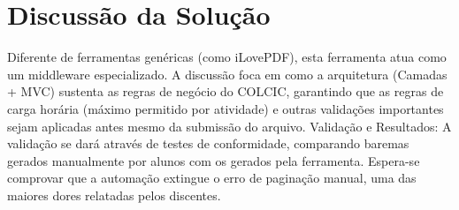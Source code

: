 \chapter{Discussão da Solução}

Diferente de ferramentas genéricas (como iLovePDF), esta ferramenta atua como um middleware especializado. A discussão foca em como a arquitetura (Camadas + MVC) sustenta as regras de negócio do COLCIC, garantindo que as regras de carga horária (máximo permitido por atividade) e outras validações importantes sejam aplicadas antes mesmo da submissão do arquivo.
Validação e Resultados: A validação se dará através de testes de conformidade, comparando baremas gerados manualmente por alunos com os gerados pela ferramenta. Espera-se comprovar que a automação extingue o erro de paginação manual, uma das maiores dores relatadas pelos discentes.
